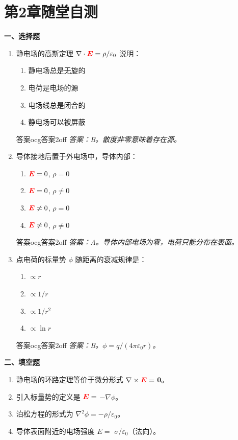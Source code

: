 \documentclass[11pt,a4paper,openany,oneside]{book}
\newcommand{\vecE}{\textcolor{red}{\vect{E}}}
\newcommand{\eps}{\varepsilon}
\newcommand{\vect}[1]{\bm{#1}}
\newcommand{\grad}{\nabla}
\newcommand{\curl}{\nabla\times}
\newcommand{\divg}{\nabla\cdot}
\newcommand{\lap}{\nabla^2}
\begin{document}
\section*{第2章随堂自测}

\begin{miniquiz}
\textbf{一、选择题}
\begin{enumerate}[label=\arabic*.]
\item 静电场的高斯定理 $\divg\vecE = \rho/\eps_0$ 说明：
  \begin{enumerate}[label=(\Alph*),nosep]
  \item 静电场总是无旋的
  \item 电荷是电场的源
  \item 电场线总是闭合的
  \item 静电场可以被屏蔽
  \end{enumerate}
\begin{ocg}{答案}{ocg答案2}{off}
  \textit{答案：B。散度非零意味着存在源。}
\end{ocg}

\item 导体接地后置于外电场中，导体内部：
  \begin{enumerate}[label=(\Alph*),nosep]
  \item $\vecE=0$, $\rho=0$
  \item $\vecE=0$, $\rho\neq 0$
  \item $\vecE\neq 0$, $\rho=0$
  \item $\vecE\neq 0$, $\rho\neq 0$
  \end{enumerate}
\begin{ocg}{答案}{ocg答案2}{off}
  \textit{答案：A。导体内部电场为零，电荷只能分布在表面。}
\end{ocg}

\item 点电荷的标量势 $\phi$ 随距离的衰减规律是：
  \begin{enumerate}[label=(\Alph*),nosep]
  \item $\propto r$
  \item $\propto 1/r$
  \item $\propto 1/r^2$
  \item $\propto \ln r$
  \end{enumerate}
\begin{ocg}{答案}{ocg答案2}{off}
  \textit{答案：B。$\phi = q/(4\pi\eps_0 r)$。}
\end{ocg}
\end{enumerate}

\vspace{0.5em}
\textbf{二、填空题}
\begin{enumerate}[label=\arabic*.,resume]
\item 静电场的环路定理等价于微分形式 $\curl\vecE=$ \underline{$\vect{0}$}。
\item 引入标量势的定义是 $\vecE = $ \underline{$-\grad\phi$}。
\item 泊松方程的形式为 \underline{$\lap\phi = -\rho/\eps_0$}。
\item 导体表面附近的电场强度 $E = $ \underline{$\sigma/\eps_0$}（法向）。
\end{enumerate}
\end{miniquiz}
\end{document}
